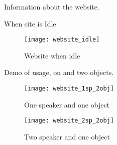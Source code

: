 Information about the website.

When site is Idle

\begin{figure}[h]
    \centering
    \texttt{[image: website\_idle]}
    \caption{Website when idle}
    \label{fig:website_idle}
\end{figure}

Demo of usage, on and two objects.
\begin{figure}
    \centering
        \begin{minipage}{.5\textwidth}
            \centering
            \texttt{[image: website\_1sp\_2obj]}
            \caption{One speaker and one object}
            \label{fig:website_1sp_2obj}
        \end{minipage}%
        \begin{minipage}{.5\textwidth}
            \centering
            \texttt{[image: website\_2sp\_2obj]}
            \caption{Two speaker and one object}
            \label{fig:website_2sp_2obj}
    \end{minipage}
\end{figure}


